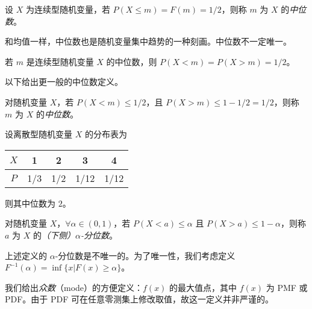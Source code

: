 \documentclass[../main.tex]{subfiles}
\begin{document}
\begin{definition}\label{def:4.2.1}
    设 $X$ 为连续型随机变量，若 $P(X\leq m)=F(m)=1/2$，则称 $m$ 为 $X$ 的\emph{中位数}。
\end{definition}

和均值一样，中位数也是随机变量集中趋势的一种刻画。中位数不一定唯一。

若 $m$ 是连续型随机变量 $X$ 的中位数，则 $P(X<m)=P(X>m)=1/2$。

以下给出更一般的中位数定义。

\begin{definition}\label{def:4.2.2}
    对随机变量 $X$，若 $P(X<m)\leq 1/2$，且 $P(X>m)\leq 1-1/2=1/2$，则称 $m$ 为 $X$ 的\emph{中位数}。
\end{definition}

\begin{example}
    设离散型随机变量 $X$ 的分布表为

    \bigskip
    \begin{tabular}{|c|c|c|c|c|}
        \hline
        $X$ & 1   & 2   & 3    & 4    \\
        \hline
        $P$ & 1/3 & 1/2 & 1/12 & 1/12 \\
        \hline
    \end{tabular}
    \bigskip

    则其中位数为 $2$。
\end{example}

\begin{definition}\label{def:4.2.3}
    对随机变量 $X$，$\forall\alpha\in(0,1)$，若 $P(X<a)\leq\alpha$ 且 $P(X>a)\leq1-\alpha$，则称 $a$ 为 $X$ 的\emph{（下侧）$\alpha$-分位数}。
\end{definition}

上述定义的 $\alpha$-分位数是不唯一的。为了唯一性，我们考虑定义 $F^{-1}(\alpha)=\inf\{x|F(x)\geq\alpha\}$。

我们给出\emph{众数}（mode）的方便定义：$f(x)$ 的最大值点，其中 $f(x)$ 为 PMF 或 PDF。由于 PDF 可在任意零测集上修改取值，故这一定义并非严谨的。
\end{document}
